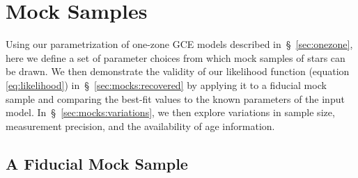 \documentclass[ms.tex]{subfiles}
\begin{document}
\section{Mock Samples}
\label{sec:mocks}

Using our parametrization of one-zone GCE models described
in~\S~\ref{sec:onezone}, here we define a set of parameter choices from which
mock samples of stars can be drawn.
We then demonstrate the validity of our likelihood function (equation
\ref{eq:likelihood}) in~\S~\ref{sec:mocks:recovered} by applying it to a
fiducial mock sample and comparing the best-fit values to the known parameters
of the input model.
In~\S~\ref{sec:mocks:variations}, we then explore variations in sample size,
measurement precision, and the availability of age information.

\subsection{A Fiducial Mock Sample}
\label{sec:mocks:fiducial}
\end{document}
